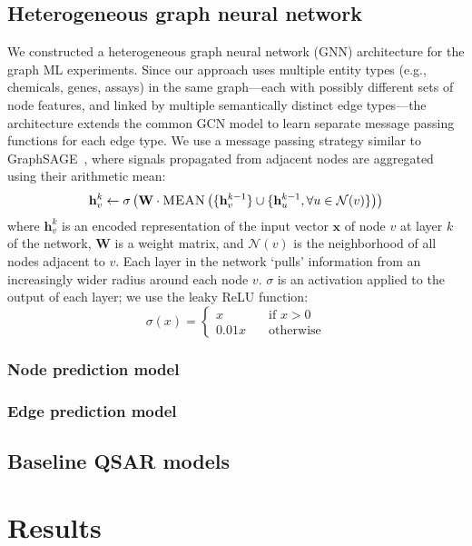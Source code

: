 \documentclass{ws-procs11x85}
\begin{document}
\subsection{Heterogeneous graph neural network}
We constructed a heterogeneous graph neural network (GNN) architecture for the graph ML experiments.
Since our approach uses multiple entity types (e.g., chemicals, genes, assays) in the same graph---each with possibly different sets of node features, and linked by multiple semantically distinct edge types---the architecture extends the common GCN model to learn separate message passing functions for each edge type.
We use a message passing strategy similar to GraphSAGE~\cite{hamilton2017inductive}, where signals propagated from adjacent nodes are aggregated using their arithmetic mean:
\begin{equation}
\mathbf{h}_v^k \gets \sigma\left(\mathbf{W} \cdot \textsc{MEAN}\left(\{\mathbf{h}_v^{k-1}\}\cup \{ \mathbf{h}_u^{k-1},\forall u \in \mathcal{N}(v) \}\right)\right)
\end{equation}
where $\mathbf{h}_v^{k}$ is an encoded representation of the input vector $\mathbf{x}$ of node $v$ at layer $k$ of the network, $\mathbf{W}$ is a weight matrix, and $\mathcal{N}(v)$ is the neighborhood of all nodes adjacent to $v$.
Each layer in the network `pulls' information from an increasingly wider radius around each node $v$.
$\sigma$ is an activation applied to the output of each layer; we use the leaky ReLU function:
\begin{equation}
\sigma(x) =
\begin{cases}
   x & \quad \text{if } x > 0\\
   0.01x & \quad \text{otherwise}
\end{cases}
\end{equation}

\subsubsection{Node prediction model}

\subsubsection{Edge prediction model}

\subsection{Baseline QSAR models}

\section{Results}
\end{document}

